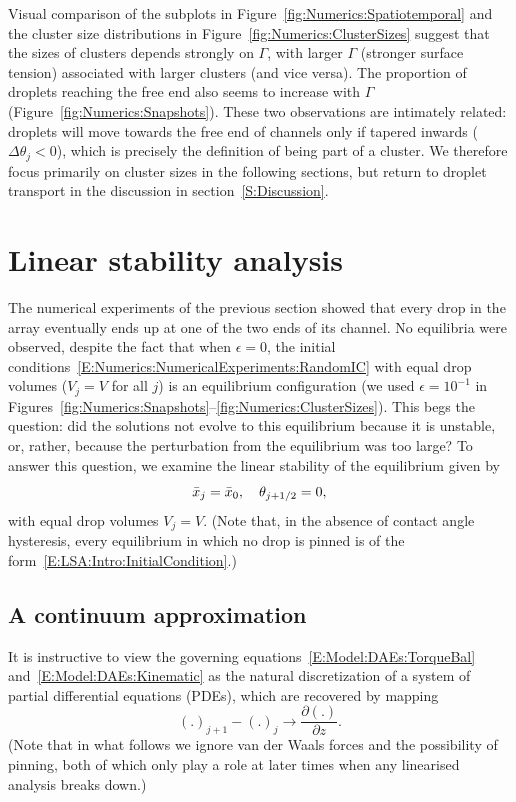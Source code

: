 Visual comparison of the subplots in Figure~\ref{fig:Numerics:Spatiotemporal} and the cluster size distributions in Figure~\ref{fig:Numerics:ClusterSizes} suggest that the sizes of clusters depends strongly on $\Gamma$, with larger $\Gamma$ (stronger surface tension) associated with larger clusters (and vice versa). The proportion of droplets reaching the free end also seems to increase with $\Gamma$ (Figure~\ref{fig:Numerics:Snapshots}). These two observations are intimately related: droplets will move towards the free end of channels only if tapered inwards ($\Delta \theta_j < 0$), which is precisely the definition of being part of a cluster. We therefore focus primarily on cluster sizes in the following sections, but return to droplet transport in the discussion in section~\ref{S:Discussion}.

\section{Linear stability analysis}\label{S:LSA}
The numerical experiments of the previous section showed that every drop in the array eventually ends up at one of the two ends of its channel. No equilibria were observed, despite the fact that when $\epsilon = 0$, the initial conditions~\eqref{E:Numerics:NumericalExperiments:RandomIC} with equal drop volumes ($V_j = V$ for all $j$) is an equilibrium configuration (we used $\epsilon = 10^{-1}$ in Figures~\ref{fig:Numerics:Snapshots}--\ref{fig:Numerics:ClusterSizes}). This begs the question: did the solutions not evolve to this equilibrium because it is unstable, or, rather, because the perturbation from the equilibrium was too large? To answer this question, we examine the linear stability of the equilibrium given by
\begin{equation}\label{E:LSA:Intro:InitialCondition}
\bar{x}_j = \bar{x}_0,\quad \theta_{j+1/2} = 0,
\end{equation}
with equal drop volumes $V_j = V$. (Note that, in the absence of contact angle hysteresis, every equilibrium in which no drop is pinned is of the form~\eqref{E:LSA:Intro:InitialCondition}.)
\subsection{A continuum approximation}\label{S:LSA:Continuum}
It is instructive to view the governing equations~\eqref{E:Model:DAEs:TorqueBal} and~\eqref{E:Model:DAEs:Kinematic} as the natural discretization of a system of partial differential equations (PDEs), which are recovered by mapping
\begin{equation}\label{E:LSA:Continuum:ContinuumMapping}
\left(.\right)_{j+1} - \left(.\right)_{j} \rightarrow \frac{\partial ( .)}{\partial z}.
\end{equation}
(Note that in what follows we ignore van der Waals forces and the possibility of pinning, both of which only play a role at later times when any linearised analysis breaks down.)

